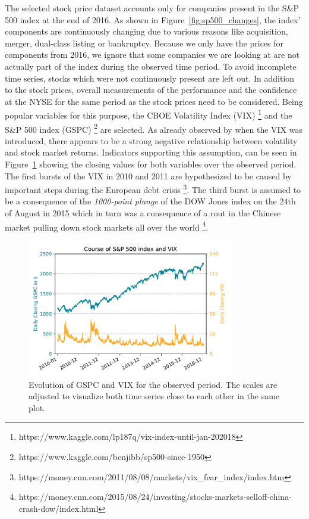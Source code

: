 
The selected stock price dataset accounts only for companies present in the S\&P 500 index at the end of 2016. As shown in Figure~\ref{fig:sp500_changes}, the index' components are continuously changing due to various reasons like acquisition, merger, dual-class listing or bankruptcy. Because we only have the prices for components from 2016, we ignore that some companies we are looking at are not actually part of the index during the observed time period. To avoid incomplete time series, stocks which were not continuously present are left out. In addition to the stock prices, overall measurements of the performance and the confidence at the NYSE for the same period as the stock prices need to be considered. Being popular variables for this purpose, the CBOE Volatility Index (VIX) \footnote{https://www.kaggle.com/lp187q/vix-index-until-jan-202018} and the S\&P 500 index (GSPC) \footnote{https://www.kaggle.com/benjibb/sp500-since-1950} are selected. As already observed by \citet{Fleming1995PredictingMeasure} when the VIX was introduced, there appears to be a strong negative relationship between volatility and stock market returns. Indicators supporting this assumption, can be seen in Figure~\ref{fig:index_and_vix} showing the closing values for both variables over the observed period. The first bursts of the VIX in 2010 and 2011 are hypothesized to be caused by important steps during the European debt crisis \footnote{https://money.cnn.com/2011/08/08/markets/vix\_fear\_index/index.htm}. The third burst is assumed to be a consequence of the \emph{1000-point plunge} of the DOW Jones index on the 24th of August in 2015 which in turn was a consequence of a rout in the Chinese market pulling down stock markets all over the world \footnote{https://money.cnn.com/2015/08/24/investing/stocks-markets-selloff-china-crash-dow/index.html}.

\begin{figure}[!ht]
    \centering
    \includegraphics[width=0.8\textwidth]{figures/data/index-and-vix.pdf}
    \caption{Evolution of GSPC and VIX for the observed period. The scales are adjusted to visualize both time series close to each other in the same plot.}
    \label{fig:index_and_vix}
\end{figure}

